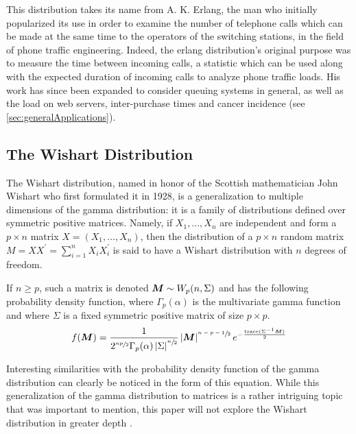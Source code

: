 \documentclass[12pt]{article}
\begin{document}
This distribution takes its name from A. K. Erlang, the man who initially popularized its use in order to examine the
number of telephone calls which can be made at the same time to the operators of the switching stations, in the field of
phone traffic engineering. Indeed, the erlang distribution's original purpose was to measure the time between incoming
calls, a statistic which can be used along with the expected duration of incoming calls to analyze phone traffic loads.
His work has since been expanded to consider queuing systems in general, as well as the load on web servers,
inter-purchase times and cancer incidence (see \autoref{sec:generalApplications})\cite{zachWhatErlangDistribution2020}.


\pagebreak
\subsection{The Wishart Distribution}
The Wishart distribution, named in honor of the Scottish mathematician John Wishart who first formulated it in 1928, is
a generalization to multiple dimensions of the gamma distribution: it is a  family of distributions defined over symmetric
positive matrices. Namely, if $X_1, ..., X_n$ are independent and form a $p\times n$ matrix $X =  (X_1, ..., X_n)$, then
the distribution of a $p\times n$ random matrix $M = XX^\prime = \sum^n_{i=1}X_iX^\prime_i$ is said to have a Wishart
distribution with $n$ degrees of freedom.

If $n\geq p$, such a matrix is denoted $\bm{M}\sim W_p(n, \Sigma)$ and has the following probability density function,
where $\Gamma_p(\alpha)$ is the multivariate gamma function and where $\Sigma$ is a fixed symmetric positive matrix of
size $p \times p$.
\begin{equation}
	f(\bm{M}) = \frac{1}{2^{\sfrac{np}{2}}\Gamma_p(\alpha)\left|\Sigma\right|^{\sfrac{n}{2}}}\left|\bm{M}\right|^{\sfrac{n-p-1}{2}}e^{-\frac{\text{trace}(\Sigma^{-1}\bm{M})}{2}}
\end{equation}

Interesting similarities with the probability density function of the gamma distribution can clearly be noticed in the
form of this equation. While this generalization of the gamma distribution to matrices is a rather intriguing topic that
was important to mention, this paper will not explore the Wishart distribution in greater depth
\cite{wikipediaWishartDistribution2022}.
\end{document}
